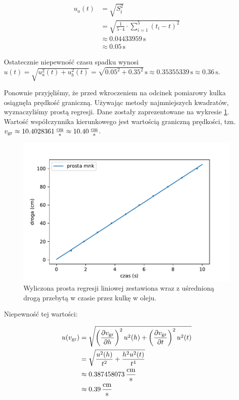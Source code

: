 \documentclass[a4paper]{article}
\begin{document}
\begin{align*}
	u_a(t) &= \sqrt{S^{2}_{\overline{t}}} \\
	&= \sqrt{\frac{1}{5 \cdot 4} \cdot \sum_{i=1}^{5} (t_i - t)^2} \\
	&\approx 0.04433959 \, \text{s} \\
	&\approx 0.05 \, \text{s}
\end{align*}

Ostatecznie niepewność czasu spadku wynosi $u(t) = \sqrt{u_a^2(t) + u_b^2(t)} = \sqrt{0.05^2 + 0.35^2} \, \text{s} \approx 0.35355339 \, \text{s} \approx 0.36\, \text{s}$.

Ponownie przyjęliśmy, że przed wkroczeniem na odcinek pomiarowy kulka osiągnęła prędkość graniczną.
Używając metody najmniejszych kwadratów, wyznaczyliśmy prostą regresji.
Dane zostały zaprezentowane na wykresie \ref{wykres_olej}.
Wartość współczynnika kierunkowego jest wartością graniczną prędkości, tzn.
$v_{\text{gr}} \approx 10.4028361 \, \frac{\text{cm}}{\text{s}} \approx 10.40 \, \frac{\text{cm}}{\text{s}}$.

\begin{figure}[h]
\centering
\includegraphics[scale=0.7]{regresja_olej.pdf}
\caption{Wyliczona prosta regresji liniowej zestawiona wraz z uśrednioną drogą przebytą w czasie przez kulkę w oleju.}
\label{wykres_olej}
\end{figure}

Niepewność tej wartości:

\begin{align*}
	u(v_{\text{gr}}) &= \sqrt{\left(\frac{\partial v_{\text{gr}}}{\partial h}\right)^2 u^2(h) + \left(\frac{\partial v_{\text{gr}}}{\partial t}\right)^2 u^2(t)} \\
	&= \sqrt{\frac{u^2(h)}{t^2} + \frac{h^2 u^2(t)}{t^4}} \\
	&\approx 0.387458073 \, \frac{\text{cm}}{\text{s}} \\
	&\approx 0.39 \, \frac{\text{cm}}{\text{s}}
\end{align*}
\end{document}
